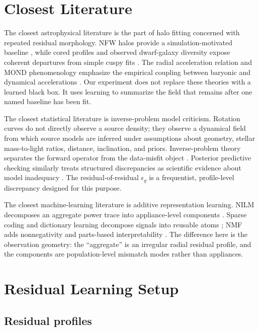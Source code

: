 \documentclass[10pt,twocolumn]{article}
\newcommand{\epsg}{\epsilon_g}
\begin{document}
\section{Closest Literature}

The closest astrophysical literature is the part of halo fitting concerned with
repeated residual morphology. NFW halos provide a simulation-motivated baseline
\citep{Navarro1996,Navarro1997}, while cored profiles and observed dwarf-galaxy
diversity expose coherent departures from simple cuspy fits
\citep{Burkert1995,deBlok2010,Oman2015}. The radial acceleration relation and
MOND phenomenology emphasize the empirical coupling between baryonic and
dynamical accelerations \citep{Milgrom1983,Famaey2012,McGaugh2016}. Our
experiment does not replace these theories with a learned black box. It uses
learning to summarize the field that remains after one named baseline has been
fit.

The closest statistical literature is inverse-problem model criticism. Rotation
curves do not directly observe a source density; they observe a dynamical field
from which source models are inferred under assumptions about geometry, stellar
mass-to-light ratios, distance, inclination, and priors. Inverse-problem theory
separates the forward operator from the data-misfit object
\citep{Tarantola2005}. Posterior predictive checking similarly treats
structured discrepancies as scientific evidence about model inadequacy
\citep{Gelman1996}. The residual-of-residual $\epsg$ is a frequentist,
profile-level discrepancy designed for this purpose.

The closest machine-learning literature is additive representation learning.
NILM decomposes an aggregate power trace into appliance-level components
\citep{Hart1992,Kolter2012}. Sparse coding and dictionary learning decompose
signals into reusable atoms \citep{Olshausen1996,Aharon2006,Mairal2010}; NMF
adds nonnegativity and parts-based interpretability \citep{LeeSeung1999}. The
difference here is the observation geometry: the ``aggregate'' is an irregular
radial residual profile, and the components are population-level mismatch
modes rather than appliances.

\section{Residual Learning Setup}

\subsection{Residual profiles}
\end{document}
